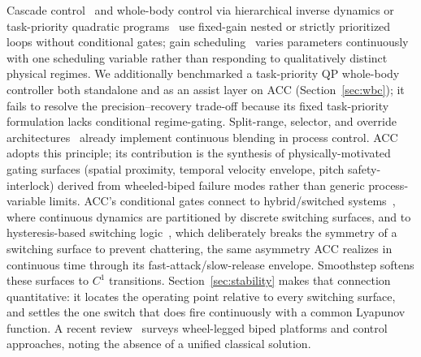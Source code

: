 \documentclass[a4paper,fleqn]{cas-dc}
\begin{document}
Cascade control~\cite{cascade_standard} and whole-body control via hierarchical inverse dynamics or task-priority quadratic programs~\cite{herzog2016wbc,bellicoso2018wbc,escande2014hqp} use fixed-gain nested or strictly prioritized loops without conditional gates; gain scheduling~\cite{gain_scheduling_survey,leith2000gainsched} varies parameters continuously with one scheduling variable rather than responding to qualitatively distinct physical regimes.
We additionally benchmarked a task-priority QP whole-body controller both standalone and as an assist layer on ACC (Section~\ref{sec:wbc}); it fails to resolve the precision--recovery trade-off because its fixed task-priority formulation lacks conditional regime-gating.
Split-range, selector, and override architectures~\cite{shinskey1996,astrom2005advanced} already implement continuous blending in process control. ACC adopts this principle; its contribution is the synthesis of physically-motivated gating surfaces (spatial proximity, temporal velocity envelope, pitch safety-interlock) derived from wheeled-biped failure modes rather than generic process-variable limits.
ACC's conditional gates connect to hybrid/switched systems~\cite{liberzon2003switching}, where continuous dynamics are partitioned by discrete switching surfaces, and to hysteresis-based switching logic~\cite{hespanha2003hysteresis}, which deliberately breaks the symmetry of a switching surface to prevent chattering, the same asymmetry ACC realizes in continuous time through its fast-attack/slow-release envelope. Smoothstep softens these surfaces to $C^1$ transitions. Section~\ref{sec:stability} makes that connection quantitative: it locates the operating point relative to every switching surface, and settles the one switch that does fire continuously with a common Lyapunov function.
A recent review~\cite{liu2024review} surveys wheel-legged biped platforms and control approaches, noting the absence of a unified classical solution.
\end{document}
